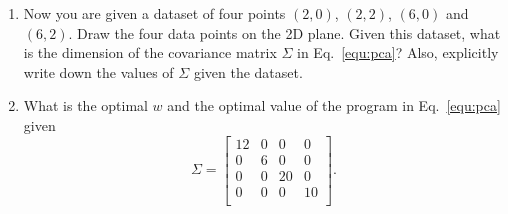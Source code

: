 \begin{Q}
\begin{enumerate}
\item Now you are given a dataset of four points $(2,0)$, $(2,2)$, $(6,0)$ and $(6,2)$. Draw the four data points on the 2D plane. Given this dataset, what is the dimension of the covariance matrix $\Sigma$ in Eq.~\eqref{equ:pca}? Also, explicitly write down the values of $\Sigma$ given the dataset.

\item What is the optimal $w$ and the optimal value of the program in Eq.~\eqref{equ:pca}  given \[ \Sigma= \left[ \begin{array}{cccc}
	12 & 0 & 0 & 0\\
	0 & 6 & 0 & 0\\
	0 & 0 & 20 & 0\\
	0 & 0 & 0 & 10\\
	\end{array} \right].\] 


\end{enumerate}
\end{Q}
          